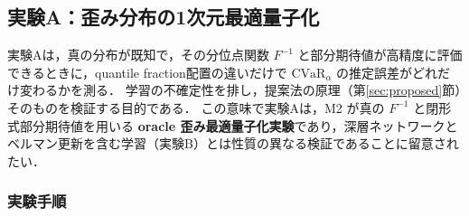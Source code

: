 \documentclass[a4paper,10pt]{jsarticle}
\theoremstyle{definition}
\newcommand{\CVaR}{\mathrm{CVaR}}
\newcommand{\Finv}{F^{-1}}
\begin{document}
\subsection{実験A：歪み分布の1次元最適量子化}
\label{subsec:expA}
実験Aは，真の分布が既知で，その分位点関数 $\Finv$ と部分期待値が高精度に評価できるときに，quantile fraction配置の違いだけで $\CVaR_\alpha$ の推定誤差がどれだけ変わるかを測る．
学習の不確定性を排し，提案法の原理（第\ref{sec:proposed}節）そのものを検証する目的である．
この意味で実験Aは，M2 が真の $\Finv$ と閉形式部分期待値を用いる \textbf{oracle 歪み最適量子化実験}であり，深層ネットワークとベルマン更新を含む学習（実験B）とは性質の異なる検証であることに留意されたい．

\subsubsection{実験手順}
\end{document}
